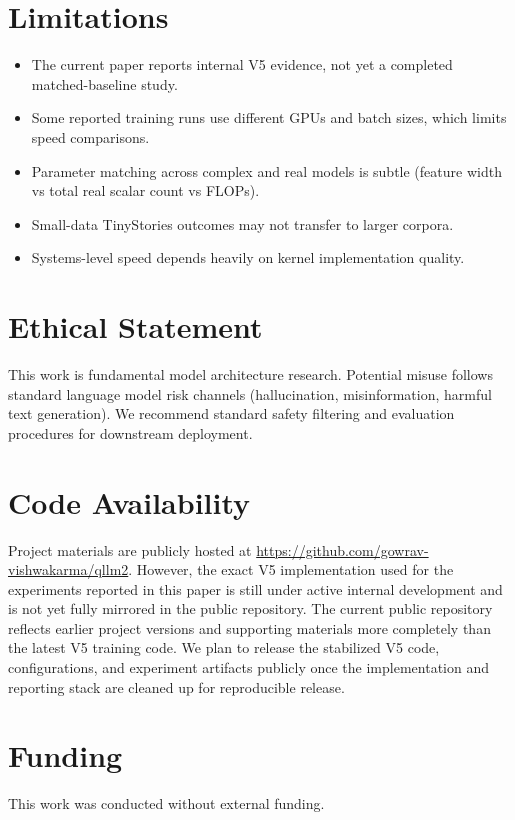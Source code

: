 \documentclass[11pt]{article}
\begin{document}
\section{Limitations}
\begin{itemize}[leftmargin=1.2em]
  \item The current paper reports internal V5 evidence, not yet a completed matched-baseline study.
  \item Some reported training runs use different GPUs and batch sizes, which limits speed comparisons.
  \item Parameter matching across complex and real models is subtle (feature width vs total real scalar count vs FLOPs).
  \item Small-data TinyStories outcomes may not transfer to larger corpora.
  \item Systems-level speed depends heavily on kernel implementation quality.
\end{itemize}

\section{Ethical Statement}
This work is fundamental model architecture research.
Potential misuse follows standard language model risk channels (hallucination, misinformation, harmful text generation).
We recommend standard safety filtering and evaluation procedures for downstream deployment.

\section*{Code Availability}
Project materials are publicly hosted at \url{https://github.com/gowrav-vishwakarma/qllm2}.
However, the exact V5 implementation used for the experiments reported in this paper is still under active internal development and is not yet fully mirrored in the public repository.
The current public repository reflects earlier project versions and supporting materials more completely than the latest V5 training code.
We plan to release the stabilized V5 code, configurations, and experiment artifacts publicly once the implementation and reporting stack are cleaned up for reproducible release.

\section*{Funding}
This work was conducted without external funding.
\end{document}
